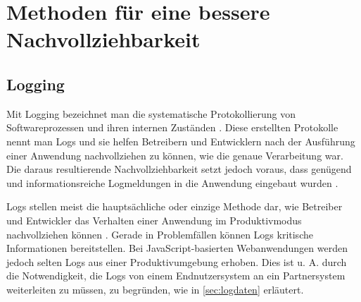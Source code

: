 

\vspace{-\baselineskip}

\section{Methoden für eine bessere Nachvollziehbarkeit}

\subsection{Logging}


Mit Logging bezeichnet man die systematische Protokollierung von Softwareprozessen und ihren internen Zuständen \cite{LearningToLog}. Diese erstellten Protokolle nennt man Logs und sie helfen Betreibern und Entwicklern nach der Ausführung einer Anwendung nachvollziehen zu können, wie die genaue Verarbeitung war. Die daraus resultierende Nachvollziehbarkeit setzt jedoch voraus, dass genügend und informationsreiche Logmeldungen in die Anwendung eingebaut wurden \cite{LearningToLog}.

Logs stellen meist die hauptsächliche oder einzige Methode dar, wie Betreiber und Entwickler das Verhalten einer Anwendung im Produktivmodus nachvollziehen können \cite{LearningToLog}. Gerade in Problemfällen können Logs kritische Informationen bereitstellen. Bei JavaScript-basierten Webanwendungen werden jedoch selten Logs aus einer Produktivumgebung erhoben. Dies ist u. A. durch die Notwendigkeit, die Logs von einem Endnutzersystem an ein Partnersystem weiterleiten zu müssen, zu begründen, wie in \autoref{sec:logdaten} erläutert.


